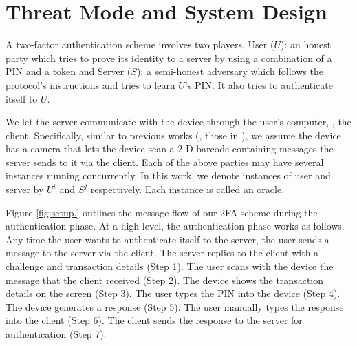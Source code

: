 


\section{Threat Mode and System Design}\label{sec::model}

A two-factor authentication scheme involves two players,
%
%
%
%
 {User ($U$)}: an honest party which tries to prove its identity to a server by using a combination of a PIN and a token and {Server ($S$)}:  a semi-honest adversary which follows the protocol's instructions and tries to learn $U$'s PIN. It also tries to authenticate itself to $U$.  


We let the server communicate with the device through the user's computer, \ie, the client. Specifically, similar to previous works (\eg, those in \cite{JareckiJKSS21,Digipass-website,Gemalto}), we assume the device has a camera that lets the device scan a 2-D barcode containing messages the server sends to it via the client. Each of the above parties may have several instances running concurrently. In this work, we denote instances of user and server by  $U^{i}$ and  $S^{j}$ respectively. Each instance is called an oracle.  

Figure \ref{fig:setup.} outlines the message flow of our 2FA scheme during the authentication phase.  At a high level, the authentication phase works as follows. Any time the user wants to authenticate itself to the server, the user sends a message to the server via the client.  The server replies to the client with a challenge and transaction details (Step 1). The user scans with the device the message that the client received  (Step 2). The device shows the transaction details on the screen (Step 3). The user types the PIN into the device (Step 4). The device generates a response (Step 5). The user manually types the response into the client (Step 6).  The client sends the response to the server for authentication (Step 7). 


